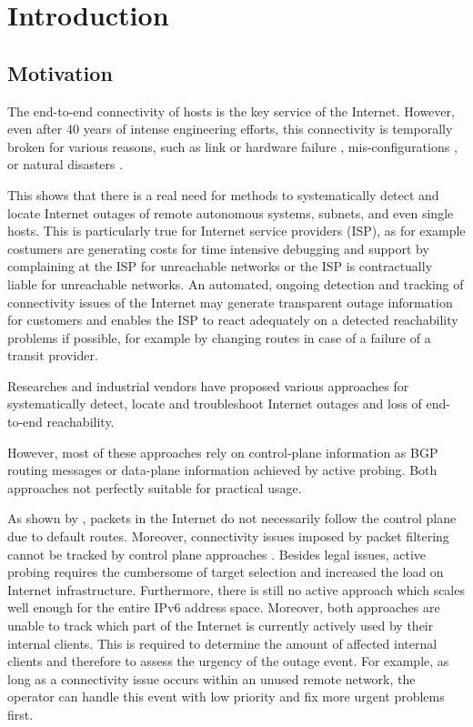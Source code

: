 

\chapter{Introduction\label{Introduction}}
\section{Motivation}

The end-to-end connectivity of hosts is the key service of the Internet.
However, even after 40 years of intense engineering efforts, this connectivity
is temporally broken for various reasons, such as link or hardware failure
\citep{Markopoulou:2008}, mis-configurations \citep{Mahajan:2002}, or natural
disasters \citep{Dainotti:2012:EBH,Schulman:2011}. 

This shows that there is a real need for methods to systematically detect and
locate Internet outages of remote autonomous systems, subnets, and even single
hosts. This is particularly true for Internet service providers (ISP), as for
example costumers are generating costs for time intensive debugging and support
by complaining at the ISP for unreachable networks or the ISP is contractually
liable for unreachable networks. An automated, ongoing detection and tracking of
connectivity issues of the Internet may generate transparent outage information
for customers and enables the ISP to react adequately on a detected reachability
problems if possible, for example by changing routes in case of a failure of a
transit provider. 

Researches and industrial vendors have proposed various approaches for
systematically detect, locate and troubleshoot Internet outages and loss of
end-to-end reachability.

However, most of these approaches rely on control-plane information as BGP
routing messages or data-plane information achieved by active probing. Both
approaches not perfectly suitable for practical usage.

As shown by \citet{Bush:Optometry}, packets in the Internet do not necessarily
follow the control plane due to default routes. Moreover, connectivity issues
imposed by packet filtering cannot be tracked by control plane approaches
\citep{Dainotti:2011:ACI}. Besides legal issues, active probing requires the
cumbersome of target selection and increased the load on Internet
infrastructure. Furthermore, there is still no active approach which scales well
enough for the entire IPv6 address space. Moreover, both approaches are unable
to track which part of the Internet is currently actively used by their internal
clients. This is required to determine the amount of affected internal clients
and therefore to assess the urgency of the outage event. For example, as long as
a connectivity issue occurs within an unused remote network, the operator can
handle this event with low priority and fix more urgent problems first.

